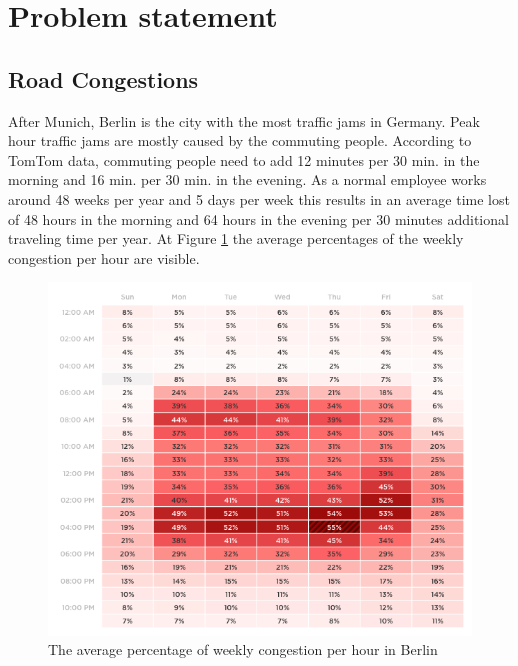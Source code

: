 \section{Problem statement} \label{sec:problems}
\subsection{Road Congestions}
After Munich, Berlin is the city with the most traffic jams in Germany. Peak hour traffic jams are mostly caused by the commuting people. According to TomTom \cite{tomtom} data, commuting people need to add 12 minutes per 30 min. in the morning and 16 min. per 30 min. in the evening. As a normal employee works around 48 weeks per year and 5 days per week this results in an average time lost of 48 hours in the morning and 64 hours in the evening per 30 minutes additional traveling time per year. At Figure \ref{averageCongestion} the average percentages of the weekly congestion per hour are visible.

\begin{figure}[h!]
	\centering
	\includegraphics[width=0.55\textheight]{ProblemsFigures/TOMTOMWeeklyAverageCongestion}
	\caption{The average percentage of weekly congestion per hour in Berlin }
	\label{averageCongestion}
\end{figure}

